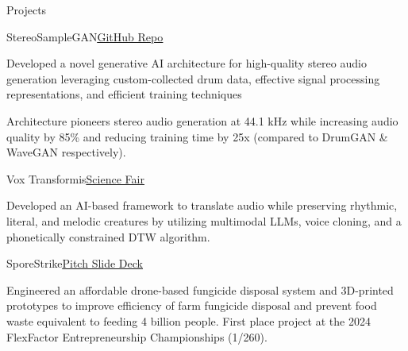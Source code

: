 \documentclass[
  11pt, %
]{resume}
\begin{document}

\begin{rSection}{Projects}

  
  \begin{rSubsection}{StereoSampleGAN}{}{\underline{\href{https://github.com/shuklabhay/stereo-sample-gan}{GitHub Repo}}}{}
       
    \item Developed a novel generative AI architecture for high-quality stereo audio generation leveraging custom-collected drum data, effective signal processing representations, and efficient training techniques
        
    \item Architecture pioneers stereo audio generation at 44.1 kHz while increasing audio quality by 85\% and reducing training time by 25x (compared to DrumGAN \& WaveGAN respectively).
        
  \end{rSubsection}
      
  \begin{rSubsection}{Vox Transformis}{}{\underline{\href{https://science-fair.org/}{Science Fair}}}{}
       
    \item Developed an AI-based framework to translate audio while preserving rhythmic, literal, and melodic creatures by utilizing multimodal LLMs, voice cloning, and a phonetically constrained DTW algorithm.
        
  \end{rSubsection}
      
  \begin{rSubsection}{SporeStrike}{}{\underline{\href{https://shuklabhay.github.io/static/projects/sporestrike/FlexFactor_SporeStrike_pitch.pdf}{Pitch Slide Deck}}}{}
       
    \item Engineered an affordable drone-based fungicide disposal system and 3D-printed prototypes to improve efficiency of farm fungicide disposal and prevent food waste equivalent to feeding 4 billion people. First place project at the 2024 FlexFactor Entrepreneurship Championships (1/260).
        
  \end{rSubsection}
      
	
\end{rSection}
    
\end{document}
